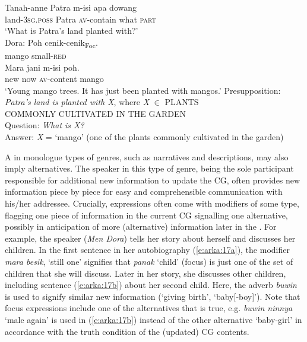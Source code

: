 \documentclass[output=paper
,modfonts
,nonflat]{langsci/langscibook}
\begin{document}
\begin{exe}
	\ex\label{e:arka:16}
	\begin{xlist}
		\ex\label{e:arka:16a}
		 Tanah-anne  Patra  m-isi    apa   dowang{\USQMark}\\
		\phantom{Miasa:} land-\textsc{3sg.poss}  Patra  \textsc{av}-contain   what   \textsc{part}\\
		\glt‘What is Patra’s land planted with?’\\
		\gll Dora: {\ob}Poh   cenik-cenik{\cb}\textsubscript{Foc}.\\
		\phantom{Dora:} \phantom{[}mango   small-\textsc{red}\\
		\gll \phantom{Dora:} Mara   jani  m-isi poh.\\
		\phantom{Dora:} new   now  \textsc{av}-content mango\\
		\glt‘Young mango trees. It has just been planted with mangos.’
		\ex\label{e:arka:16b}{Presupposition:} \textit{Patra’s land is planted with X}, where \textit{X} ${\in}$ PLANTS\\
		COMMONLY CULTIVATED IN THE GARDEN\\
		Question:   \textit{What is X?}\\
		Answer:   \textit{X} = ‘mango’ (one of the plants commonly cultivated in the garden)  
	\end{xlist}
\end{exe}

\noindent
A  in monologue types of genres, such as narratives and descriptions, may also imply alternatives. The speaker in this type of genre, being the sole participant responsible for additional new information to update the CG, often provides new information piece by piece for easy and comprehensible communication with his/her addressee. Crucially,  expressions often come with modifiers of some type, flagging one piece of information in the current CG signalling one alternative, possibly in anticipation of more (alternative) information later in the . For example, the speaker (\textit{Men Dora}) tells her story about herself and discusses her children. In the first sentence in her autobiography (\ref{e:arka:17a}), the modifier \textit{mara besik}, ‘still one’ signifies that \textit{panak} ‘child’ (focus) is just one of the set of children that she will discuss. Later in her story, she discusses other children, including sentence (\ref{e:arka:17b}) about her second child. Here, the adverb \textit{buwin} is used to signify similar new information (‘giving birth’, ‘baby[-boy]’). Note that focus expressions include one of the alternatives that is true, e.g. \textit{buwin ninnya} ‘male again’ is used in (\ref{e:arka:17b}) instead of the other alternative ‘baby-girl’ in accordance with the truth condition of the (updated) CG contents. 
\end{document}
